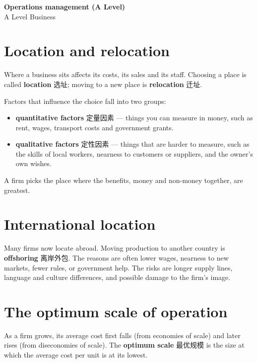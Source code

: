 \documentclass[11pt]{article}
\begin{document}
\begin{center}
  {\LARGE\bfseries Operations management (A Level)}\\[0.35em]
  {\large A Level Business}
\end{center}
\vspace{0.6em}

\section*{Location and relocation}

Where a business sits affects its costs, its sales and its staff. Choosing a place is called \textbf{location} 选址; moving to a new place is \textbf{relocation} 迁址.

Factors that influence the choice fall into two groups:

\begin{itemize}
\item \textbf{quantitative factors} 定量因素 — things you can measure in money, such as rent, wages, transport costs and government grants.

\item \textbf{qualitative factors} 定性因素 — things that are harder to measure, such as the skills of local workers, nearness to customers or suppliers, and the owner's own wishes.

\end{itemize}

A firm picks the place where the benefits, money and non-money together, are greatest.

\section*{International location}

Many firms now locate abroad. Moving production to another country is \textbf{offshoring} 离岸外包. The reasons are often lower wages, nearness to new markets, fewer rules, or government help. The risks are longer supply lines, language and culture differences, and possible damage to the firm's image.

\section*{The optimum scale of operation}

As a firm grows, its average cost first falls (from economies of scale) and later rises (from diseconomies of scale). The \textbf{optimum scale} 最优规模 is the size at which the average cost per unit is at its lowest.
\end{document}
